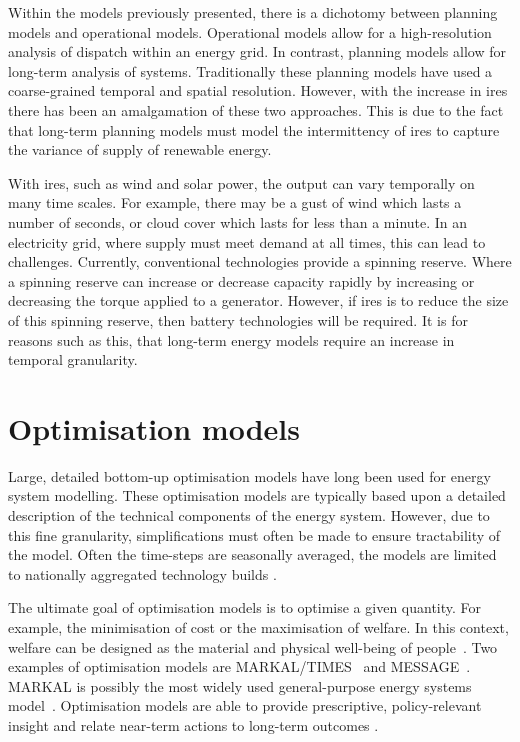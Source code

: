 Within the models previously presented, there is a dichotomy between planning models and operational models. Operational models allow for a high-resolution analysis of dispatch within an energy grid. In contrast, planning models allow for long-term analysis of systems. Traditionally these planning models have used a coarse-grained temporal and spatial resolution. However, with the increase in \acrshort{ires} there has been an amalgamation of these two approaches. This is due to the fact that long-term planning models must model the intermittency of \acrshort{ires} to capture the variance of supply of renewable energy.

With \acrshort{ires}, such as wind and solar power, the output can vary temporally on many time scales. For example, there may be a gust of wind which lasts a number of seconds, or cloud cover which lasts for less than a minute. In an electricity grid, where supply must meet demand at all times, this can lead to challenges. Currently, conventional technologies provide a spinning reserve. Where a spinning reserve can increase or decrease capacity rapidly by increasing or decreasing the torque applied to a generator. However, if \acrshort{ires} is to reduce the size of this spinning reserve, then battery technologies will be required. It is for reasons such as this, that long-term energy models require an increase in temporal granularity.





\section{Optimisation models}
\label{sec:litreview:optimisation}


Large, detailed bottom-up optimisation models have long been used for energy system modelling. These optimisation models are typically based upon a detailed description of the technical components of the energy system. However, due to this fine granularity, simplifications must often be made to ensure tractability of the model. Often the time-steps are seasonally averaged, the models are limited to nationally aggregated technology builds \cite{Pfenninger2014}.

The ultimate goal of optimisation models is to optimise a given quantity. For example, the minimisation of cost or the maximisation of welfare. In this context, welfare can be designed as the material and physical well-being of people~\cite{Keles2017}. Two examples of optimisation models are MARKAL/TIMES~\cite{Fishbone1981} and MESSAGE~\cite{Schrattenholzer1981}. MARKAL is possibly the most widely used general-purpose energy systems model~\cite{Pfenninger2014}. Optimisation models are able to provide prescriptive, policy-relevant insight and relate near-term actions to long-term outcomes \cite{DeCarolis2012}.

